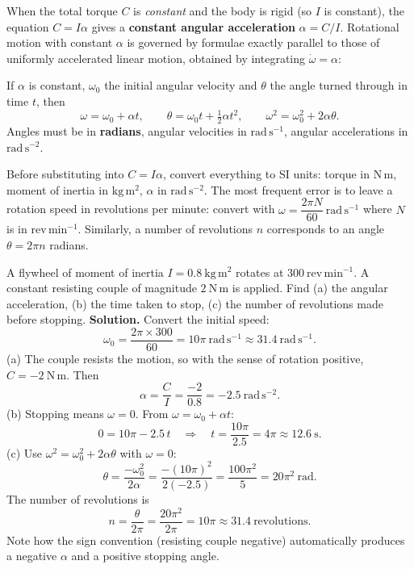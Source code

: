 \documentclass[11pt]{article}
\begin{document}
When the total torque $C$ is \emph{constant} and the body is rigid (so $I$ is constant), the equation $C = I\alpha$ gives a \textbf{constant angular acceleration} $\alpha = C/I$. Rotational motion with constant $\alpha$ is governed by formulae exactly parallel to those of uniformly accelerated linear motion, obtained by integrating $\dot{\omega} = \alpha$:

\begin{propriete}
If $\alpha$ is constant, $\omega_0$ the initial angular velocity and $\theta$ the angle turned through in time $t$, then
\[
\omega = \omega_0 + \alpha t, \qquad
\theta = \omega_0 t + \tfrac{1}{2}\alpha t^{2}, \qquad
\omega^{2} = \omega_0^{2} + 2\alpha\theta .
\]
Angles must be in \textbf{radians}, angular velocities in $\mathrm{rad\,s^{-1}}$, angular accelerations in $\mathrm{rad\,s^{-2}}$.
\end{propriete}

\begin{attention}
Before substituting into $C = I\alpha$, convert everything to SI units: torque in $\mathrm{N\,m}$, moment of inertia in $\mathrm{kg\,m^{2}}$, $\alpha$ in $\mathrm{rad\,s^{-2}}$. The most frequent error is to leave a rotation speed in revolutions per minute: convert with $\omega = \dfrac{2\pi N}{60}\ \mathrm{rad\,s^{-1}}$ where $N$ is in $\mathrm{rev\,min^{-1}}$. Similarly, a number of revolutions $n$ corresponds to an angle $\theta = 2\pi n$ radians.
\end{attention}

\begin{exoresolu}
A flywheel of moment of inertia $I = 0.8\ \mathrm{kg\,m^{2}}$ rotates at $300\ \mathrm{rev\,min^{-1}}$. A constant resisting couple of magnitude $2\ \mathrm{N\,m}$ is applied. Find (a) the angular acceleration, (b) the time taken to stop, (c) the number of revolutions made before stopping.
\tcblower
\textbf{Solution.} Convert the initial speed:
\[
\omega_0 = \frac{2\pi \times 300}{60} = 10\pi\ \mathrm{rad\,s^{-1}} \approx 31.4\ \mathrm{rad\,s^{-1}}.
\]
(a) The couple resists the motion, so with the sense of rotation positive, $C = -2\ \mathrm{N\,m}$. Then
\[
\alpha = \frac{C}{I} = \frac{-2}{0.8} = -2.5\ \mathrm{rad\,s^{-2}}.
\]
(b) Stopping means $\omega = 0$. From $\omega = \omega_0 + \alpha t$:
\[
0 = 10\pi - 2.5\,t \quad\Longrightarrow\quad t = \frac{10\pi}{2.5} = 4\pi \approx 12.6\ \mathrm{s}.
\]
(c) Use $\omega^{2} = \omega_0^{2} + 2\alpha\theta$ with $\omega = 0$:
\[
\theta = \frac{-\omega_0^{2}}{2\alpha} = \frac{-(10\pi)^{2}}{2(-2.5)} = \frac{100\pi^{2}}{5} = 20\pi^{2}\ \mathrm{rad}.
\]
The number of revolutions is
\[
n = \frac{\theta}{2\pi} = \frac{20\pi^{2}}{2\pi} = 10\pi \approx 31.4\ \text{revolutions}.
\]
Note how the sign convention (resisting couple negative) automatically produces a negative $\alpha$ and a positive stopping angle.
\end{exoresolu}
\end{document}
